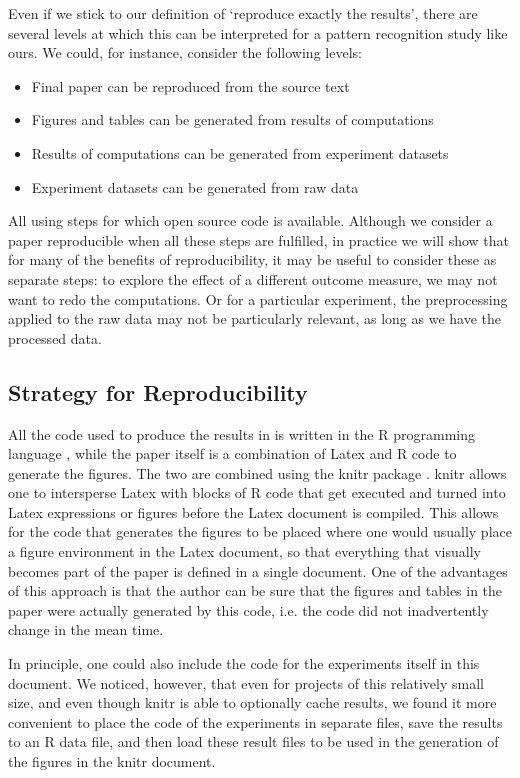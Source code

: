 \documentclass[runningheads,a4paper]{llncs}\usepackage[]{graphicx}\usepackage[]{color}
\begin{document}
Even if we stick to our definition of `reproduce exactly the results', there are several levels at which this can be interpreted for a pattern recognition study like ours. We could, for instance, consider the following levels:
\begin{itemize}
\item Final paper can be reproduced from the source text
\item Figures and tables can be generated from results of computations
\item Results of computations can be generated from experiment datasets
\item Experiment datasets can be generated from raw data 
\end{itemize}
All using steps for which open source code is available. Although we consider a paper reproducible when all these steps are fulfilled, in practice we will show that for many of the benefits of reproducibility, it may be useful to consider these as separate steps: to explore the effect of a different outcome measure, we may not want to redo the computations. Or for a particular experiment, the preprocessing applied to the raw data may not be particularly relevant, as long as we have the processed data.

\subsection{Strategy for Reproducibility}
All the code used to produce the results in \cite{Krijthe2016a} is written in the R programming language \cite{RCoreTeam2016}, while the paper itself is a combination of Latex and R code to generate the figures. The two are combined using the knitr package \cite{Xie2014}. knitr allows one to intersperse Latex with blocks of R code that get executed and turned into Latex expressions or figures before the Latex document is compiled. This allows for the code that generates the figures to be placed where one would usually place a figure environment in the Latex document, so that everything that visually becomes part of the paper is defined in a single document. One of the advantages of this approach is that the author can be sure that the figures and tables in the paper were actually generated by this code, i.e. the code did not inadvertently change in the mean time.

In principle, one could also include the code for the experiments itself in this document. We noticed, however, that even for projects of this relatively small size, and even though knitr is able to optionally cache results, we found it more convenient to place the code of the experiments in separate files, save the results to an R data file, and then load these result files to be used in the generation of the figures in the knitr document.
\end{document}
